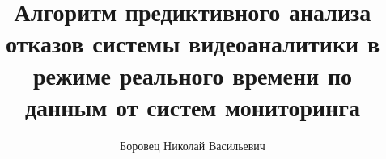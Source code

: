 \title{Алгоритм предиктивного анализа отказов системы видеоаналитики в режиме реального времени по данным от систем мониторинга}
\author{Боровец Николай Васильевич}

\makeatletter
\renewcommand{\maketitle}{
	\begin{titlepage}
		\renewcommand{\baselinestretch}{1}
		\begin{small}
			\begin{center}
				Федеральное государственное автономное образовательное учреждение\\
				высшего образования «Московский физико-технический институт\\
				(национальный исследовательский университет)»\\[.5\baselineskip]
				Физтех-школа аэрокосмических технологий\\[.5\baselineskip]
				Кафедра Аэрофизики и летательных аппаратов
			\end{center}
			
			~\
			
			\textbf{Направление подготовки:} 09.03.01 Информатика и вычислительная техника \\(бакалавриат)
			
			\textbf{Направленность (профиль) подготовки:} Компьютерное моделирование
			
			\textbf{Форма обучения:} очная
		\end{small}
		
		\vfill
		
		\begin{center}
			ВЫПУСКНАЯ КВАЛИФИКАЦИОННАЯ РАБОТА\\[.5\baselineskip]
			\textbf{«\@title»}\\[.5\baselineskip]
			(бакалаврская работа)
		\end{center}
		
		\vfill
		
		\begin{flushright}
			\begin{minipage}{.5\linewidth}
				\textbf{Студент:}\\
				\@author\\
				\(\underset{\emph{(подпись студента)}}{\uline{\hspace*{\linewidth-\baselineskip}}}\)
				
				~\
				

\end{minipage}
\end{flushright}
\end{titlepage}}
